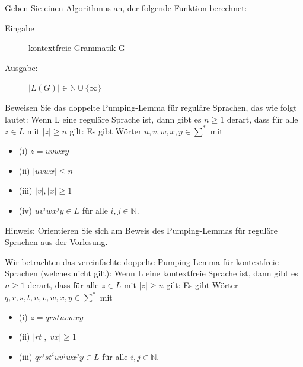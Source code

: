 \documentclass[10pt, a4paper]{exam}
\begin{document}
\begin{questions}

    \question Geben Sie einen Algorithmus an, der folgende Funktion berechnet:
    \begin{description}
        \item[Eingabe] kontextfreie Grammatik G
        \item[Ausgabe:] $|L(G)| \in\mathbb{N}\cup\{\infty\}$
    \end{description}
    \begin{solution}
    \end{solution}

    \question Beweisen Sie das doppelte Pumping-Lemma für reguläre Sprachen, das wie folgt lautet: Wenn L eine reguläre Sprache ist, dann gibt es $n\geq 1$ derart, dass für alle $z\in L$ mit $|z|\geq n$ gilt: Es gibt Wörter $u, v, w, x, y \in\sum^*$ mit
    \begin{itemize}
        \item (i) $z = uvwxy$
        \item (ii) $|uvwx | \leq n$
        \item (iii) $|v|, |x | \geq 1$
        \item (iv) $uv^i wx^j y\in L$ für alle $i, j\in\mathbb{N}$.
    \end{itemize}
    Hinweis: Orientieren Sie sich am Beweis des Pumping-Lemmas für reguläre Sprachen aus der Vorlesung.
    \begin{solution}
    \end{solution}

    \question Wir betrachten das vereinfachte doppelte Pumping-Lemma für kontextfreie Sprachen (welches nicht gilt): Wenn L eine kontextfreie Sprache ist, dann gibt es $n\geq 1$ derart, dass für alle $z\in L$ mit $|z|\geq n$ gilt: Es gibt Wörter $q, r, s, t, u, v, w, x, y \in\sum^*$ mit
    \begin{itemize}
        \item (i) $z = qrstuvwxy$
        \item (ii) $|rt |, |vx | \geq 1$
        \item (iii) $qr^i st^i uv^j wx^j y \in L$ für alle $i, j\in\mathbb{N}$.
    \end{itemize}
    \begin{parts}

\end{parts}
\end{questions}
\end{document}
